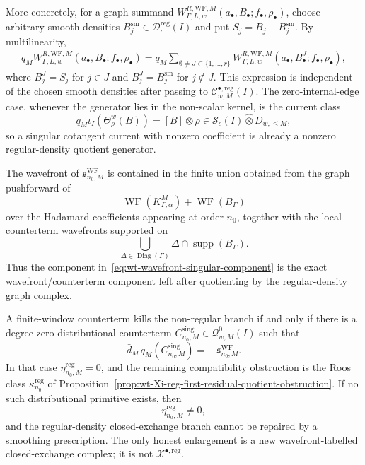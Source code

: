 \begin{thm}
  More concretely, for a graph summand
  \(W^{R,\mathrm{WF},M}_{\Gamma,L,w}
  (a_\bullet,B_\bullet;f_\bullet,\rho_\bullet)\), choose arbitrary smooth
  densities \(B_j^{\mathrm{sm}}\in\mathcal D^{\mathrm{reg}}_c(I)\) and put
  \(S_j=B_j-B_j^{\mathrm{sm}}\).  By multilinearity,
  \[
  \begin{aligned}
    q_M W^{R,\mathrm{WF},M}_{\Gamma,L,w}
      (a_\bullet,B_\bullet;f_\bullet,\rho_\bullet)
      =
    q_M\sum_{\emptyset\neq J\subset\{1,\ldots,r\}}
      W^{R,\mathrm{WF},M}_{\Gamma,L,w}
      (a_\bullet,B^J_\bullet;f_\bullet,\rho_\bullet),
  \end{aligned}
  \]
  where \(B^J_j=S_j\) for \(j\in J\) and
  \(B^J_j=B^{\mathrm{sm}}_j\) for \(j\notin J\).  This expression is
  independent of the chosen smooth densities after passing to
  \(\mathcal C^{\bullet,\mathrm{reg}}_{w,M}(I)\).  The zero-internal-edge
  case, whenever the generator lies in the non-scalar kernel, is the
  current class
  \[
    q_M\iota_I(\Theta^w_\rho(B))
      =
    [B]\otimes\rho
      \in
    \mathcal S_c(I)\widehat\otimes D_{w,\leq M},
  \]
  so a singular cotangent current with nonzero coefficient is already a
  nonzero regular-density quotient generator.

  The wavefront of \(\mathfrak s^{\mathrm{WF}}_{n_0,M}\) is contained in
  the finite union obtained from the graph pushforward of
  \[
    \operatorname{WF}(K^M_{\Gamma,\alpha})
      +\operatorname{WF}(B_\Gamma)
  \]
  over the Hadamard coefficients appearing at order \(n_0\), together with
  the local counterterm wavefronts supported on
  \[
    \bigcup_{\Delta\in\operatorname{Diag}(\Gamma)}
      \Delta\cap\operatorname{supp}(B_\Gamma).
  \]
  Thus the component in~\eqref{eq:wt-wavefront-singular-component} is the
  exact wavefront/counterterm component left after quotienting by the
  regular-density graph complex.

  A finite-window counterterm kills the non-regular branch if and only if
  there is a degree-zero distributional counterterm
  \(C^{\mathrm{sing}}_{n_0,M}\in\mathcal Q^0_{w,M}(I)\) such that
  \[
    \bar d_M\,q_M(C^{\mathrm{sing}}_{n_0,M})
      =
    -\,\mathfrak s^{\mathrm{WF}}_{n_0,M}.
  \]
  In that case
  \(\eta^{\mathrm{reg}}_{n_0,M}=0\), and the remaining compatibility
  obstruction is the Roos class
  \(\kappa^{\mathrm{reg}}_{n_0}\) of
  Proposition~\ref{prop:wt-Xi-reg-first-residual-quotient-obstruction}.
  If no such distributional primitive exists, then
  \[
    \eta^{\mathrm{reg}}_{n_0,M}\neq0,
  \]
  and the regular-density closed-exchange branch cannot be repaired by a
  smoothing prescription.  The only honest enlargement is a new
  wavefront-labelled closed-exchange complex; it is not
  \(\mathcal X^{\bullet,\mathrm{reg}}\).
\end{thm}

